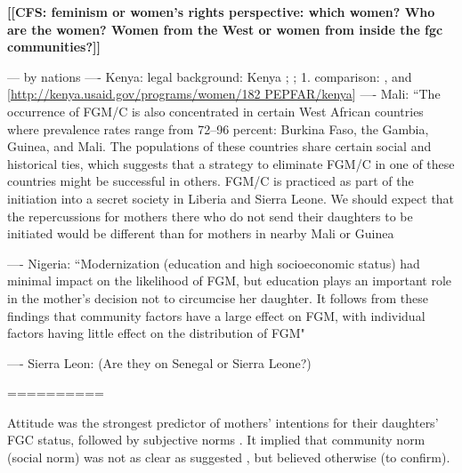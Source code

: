 \documentclass[12pt,]{article}
\newcommand{\comment}[1]{\textbf{[[#1]]}}
\newcommand{\cfcmt}[1]{\comment{CFS: #1}}
\begin{document}
\cfcmt{feminism or women’s rights perspective:  which women?  Who are the women?  Women from the West or women from inside the fgc communities?}


--- by nations
---- Kenya: legal background:  Kenya \cite{GKEN01}; \cite{UNIC13}; 
1. comparison: \cite{Chia14, Hayf05}, and [\url{http://kenya.usaid.gov/programs/women/182 PEPFAR/kenya}]
---- Mali: ``The occurrence of FGM/C is also concentrated in certain West African countries where prevalence rates range from 72–96 percent: Burkina Faso, the Gambia, Guinea, and Mali. The populations of these countries share certain social and historical ties, which suggests that a strategy to eliminate FGM/C in one of these countries might be successful in others. FGM/C is practiced as part of the initiation into a secret society in Liberia and Sierra Leone. We should expect that the repercussions for mothers there who do not send their daughters to be initiated would be different than for mothers in nearby Mali or Guinea \cite{YodaWang13}

---- Nigeria: ``Modernization (education and high socioeconomic status) had minimal impact on the likelihood of FGM, but education plays an important role in the mother's decision not to circumcise her daughter. It follows from these findings that community factors have a large effect on FGM, with individual factors having little effect on the distribution of FGM" \cite{KandNwak09}

---- Sierra Leon: 
\cite{ShelHern06, ShelHern13}  (Are they on Senegal or Sierra Leone?)

==========

Attitude was the strongest predictor of mothers' intentions for their daughters' FGC status, followed by subjective norms \cite{PashPonn16}. It implied that community norm (social norm) was not as clear as suggested \cite{EffeVogt15}, but believed otherwise \cite{DuncWand11, Hayf06, Mack96, Mack00, Mack06, Youn02} (to confirm).

\end{document}
